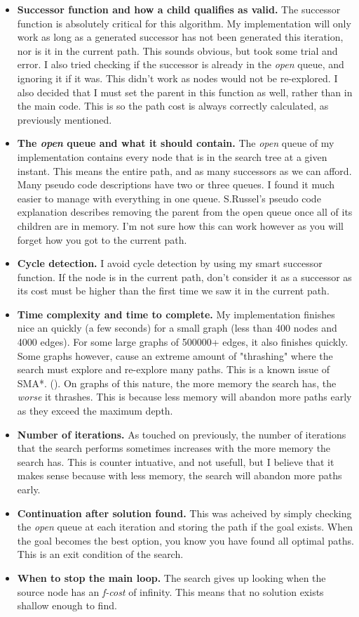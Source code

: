 \documentclass[]{article}
\begin{document}
\begin{itemize}
	\item \textbf{Successor function and how a child qualifies as valid.} The successor function is absolutely critical for this algorithm. My implementation will only work as long as a generated successor has not been generated this iteration, nor is it in the current path. This sounds obvious, but took some trial and error. I also tried checking if the successor is already in the \textit{open} queue, and ignoring it if it was. This didn't work as nodes would not be re-explored. I also decided that I must set the parent in this function as well, rather than in the main code. This is so the path cost is always correctly calculated, as previously mentioned.
	\item \textbf{The \textit{open} queue and what it should contain.} The \textit{open} queue of my implementation contains every node that is in the search tree at a given instant. This means the entire path, and as many successors as we can afford. Many pseudo code descriptions have two or three queues. I found it much easier to manage with everything in one queue. S.Russel's pseudo code explanation describes removing the parent from the open queue once all of its children are in memory. I'm not sure how this can work however as you will forget how you got to the current path.
	\item \textbf{Cycle detection.} I avoid cycle detection by using my smart successor function. If the node is in the current path, don't consider it as a successor as its cost must be higher than the first time we saw it in the current path.
	\item \textbf{Time complexity and time to complete.} My implementation finishes nice an quickly (a few seconds) for a small graph (less than 400 nodes and 4000 edges). For some large graphs of 500000+ edges, it also finishes quickly. Some graphs however, cause an extreme amount of "thrashing" where the search must explore and re-explore many paths. This is a known issue of SMA*. (\cite{norvig}). On graphs of this nature, the more memory the search has, the \textit{worse} it thrashes. This is because less memory will abandon more paths early as they exceed the maximum depth.  
	\item \textbf{Number of iterations.} As touched on previously, the number of iterations that the search performs sometimes increases with the more memory the search has. This is counter intuative, and not usefull, but I believe that it makes sense because with less memory, the search will abandon more paths early.
	\item \textbf{Continuation after solution found.} This was acheived by simply checking the \textit{open} queue at each iteration and storing the path if the goal exists. When the goal becomes the best option, you know you have found all optimal paths. This is an exit condition of the search.
	\item \textbf{When to stop the main loop.} The search gives up looking when the source node has an \textit{f-cost} of infinity. This means that no solution exists shallow enough to find.


\end{itemize}
\end{document}
